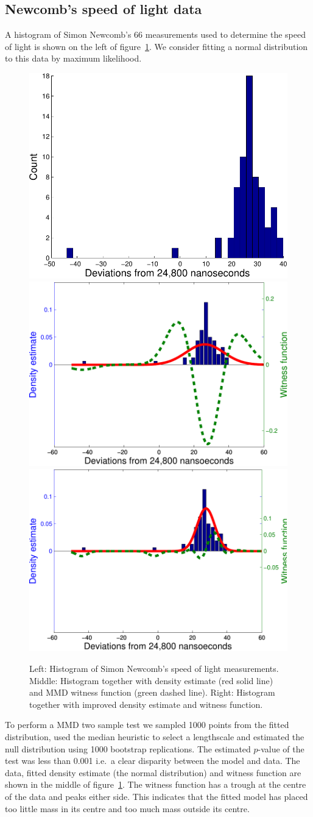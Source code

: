 \documentclass{article} %
\def\ie{i.e.\ }
\begin{document}
\subsection{Newcomb's speed of light data}

A histogram of Simon Newcomb's 66 measurements used to determine the speed of light \citep{Stigler1977-dd} is shown on the left of figure~\ref{fig:newcomb}.
We consider fitting a normal distribution to this data by maximum likelihood.

\begin{figure}[ht]
\centering
\includegraphics[width=0.29\columnwidth]{figures/newcomb_hist}
\includegraphics[width=0.32\columnwidth]{figures/newcomb_witness_1}
\includegraphics[width=0.32\columnwidth]{figures/newcomb_witness_2}
\caption{
Left: Histogram of Simon Newcomb's speed of light measurements.
Middle: Histogram together with density estimate (red solid line) and MMD witness function (green dashed line).
Right: Histogram together with improved density estimate and witness function.
}
\label{fig:newcomb}
\end{figure}

To perform a MMD two sample test we sampled 1000 points from the fitted distribution, used the median heuristic to select a lengthscale and estimated the null distribution using 1000 bootstrap replications.
The estimated $p$-value of the test was less than 0.001 \ie a clear disparity between the model and data.
The data, fitted density estimate (the normal distribution) and witness function are shown in the middle of figure~\ref{fig:newcomb}.
The witness function has a trough at the centre of the data and peaks either side.
This indicates that the fitted model has placed too little mass in its centre and too much mass outside its centre.
\end{document}
